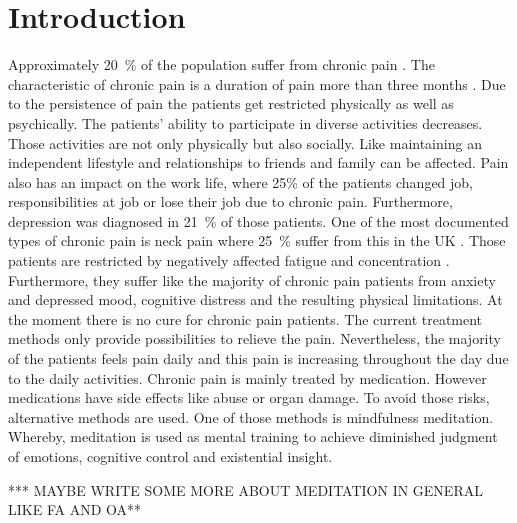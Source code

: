 \section{Introduction}
Approximately 20~\% of the population suffer from chronic pain \cite{Macfarlanea2016}. The characteristic of chronic pain is a duration of pain more than three months \cite{Mello2016}. Due to the persistence of pain the patients get restricted physically as well as psychically. The patients’ ability to participate in diverse activities decreases. Those activities are not only physically but also socially. Like maintaining an independent lifestyle and relationships to friends and family can be affected.  Pain also has an impact on the work life, where 25\% of the patients changed job, responsibilities at job or lose their job due to chronic pain. Furthermore, depression was diagnosed in 21~\% of those patients. \cite{Breivik2006}
One of the most documented types of chronic pain is neck pain where  25~\% suffer from this in the UK \cite{Macfarlanea2016}. Those patients are restricted by negatively affected fatigue and concentration \cite{vanRanderaat2016}. Furthermore, they suffer like the majority of chronic pain patients from anxiety and depressed mood, cognitive distress and the resulting physical limitations. \cite{Gross2013}
At the moment there is no cure for chronic pain patients. The current treatment methods only provide possibilities to relieve the pain. \cite{Pope2017,marcus2009} Nevertheless, the majority of the patients feels pain daily and this pain is increasing throughout the day due to the daily activities. \cite{Breivik2006} Chronic pain is mainly treated by medication. However medications have side effects like abuse or organ damage. To avoid those risks, alternative methods are used. One of those methods is mindfulness meditation. Whereby, meditation is used as mental training to achieve diminished judgment of emotions, cognitive control and existential insight. \cite{marcus2009}

*** MAYBE WRITE SOME MORE ABOUT MEDITATION IN GENERAL  LIKE FA AND OA**


